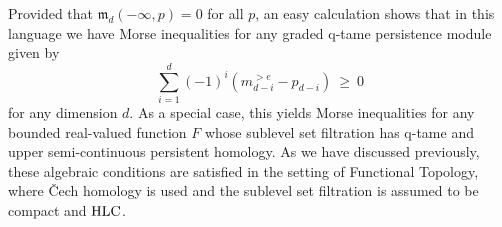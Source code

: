 Provided that $\mathfrak{m}_d(-\infty, p) = 0$ for all $p$, an easy calculation shows that in this language we have Morse inequalities for any graded q-tame persistence module given by
\begin{equation*}
    \sum_{i=1}^d (-1)^i (m^{>e}_{d-i} - p_{d-i}) \ \geq\  0
\end{equation*}
for any dimension $d$. As a special case, this yields Morse inequalities for any bounded real-valued function $F$ whose sublevel set filtration has q-tame and upper semi-continuous persistent homology. As we have discussed previously, these algebraic conditions are satisfied in the setting of Functional Topology, where \v{C}ech homology is used and the sublevel set filtration is assumed to be compact and $\mathrm{HLC}$.




